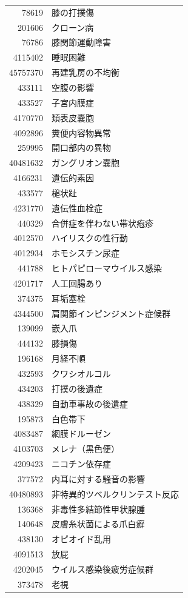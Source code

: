 \documentclass[
  11pt]{book}
\theoremstyle{definition}
\theoremstyle{definition}
\theoremstyle{definition}
\theoremstyle{definition}
\theoremstyle{remark}
\begin{document}
\begin{longtable}[]{@{}rl@{}}
78619 & 膝の打撲傷 \\
201606 & クローン病 \\
76786 & 膝関節運動障害 \\
4115402 & 睡眠困難 \\
45757370 & 再建乳房の不均衡 \\
433111 & 空腹の影響 \\
433527 & 子宮内膜症 \\
4170770 & 類表皮嚢胞 \\
4092896 & 糞便内容物異常 \\
259995 & 開口部内の異物 \\
40481632 & ガングリオン嚢胞 \\
4166231 & 遺伝的素因 \\
433577 & 槌状趾 \\
4231770 & 遺伝性血栓症 \\
440329 & 合併症を伴わない帯状疱疹 \\
4012570 & ハイリスクの性行動 \\
4012934 & ホモシスチン尿症 \\
441788 & ヒトパピローマウイルス感染 \\
4201717 & 人工回腸あり \\
374375 & 耳垢塞栓 \\
4344500 & 肩関節インピンジメント症候群 \\
139099 & 嵌入爪 \\
444132 & 膝損傷 \\
196168 & 月経不順 \\
432593 & クワシオルコル \\
434203 & 打撲の後遺症 \\
438329 & 自動車事故の後遺症 \\
195873 & 白色帯下 \\
4083487 & 網膜ドルーゼン \\
4103703 & メレナ（黒色便） \\
4209423 & ニコチン依存症 \\
377572 & 内耳に対する騒音の影響 \\
40480893 & 非特異的ツベルクリンテスト反応 \\
136368 & 非毒性多結節性甲状腺腫 \\
140648 & 皮膚糸状菌による爪白癬 \\
438130 & オピオイド乱用 \\
4091513 & 放屁 \\
4202045 & ウイルス感染後疲労症候群 \\
373478 & 老視 \\

\end{longtable}
\end{document}
